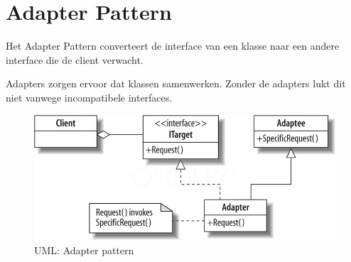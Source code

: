 \documentclass[a4paper,12pt]{article}
\begin{document}
\section{Adapter Pattern}
Het Adapter Pattern converteert de interface van een klasse naar een andere interface die de client verwacht.

Adapters zorgen ervoor dat klassen samenwerken.
Zonder de adapters lukt dit niet vanwege incompatibele interfaces.

\begin{figure}[H]
\centering
  	\includegraphics[width=.44\linewidth]{img/AdapterPattern.png}
  	\caption{UML: Adapter pattern}
  	\label{fig:AdapterPattern}
\end{figure}
\end{document}
